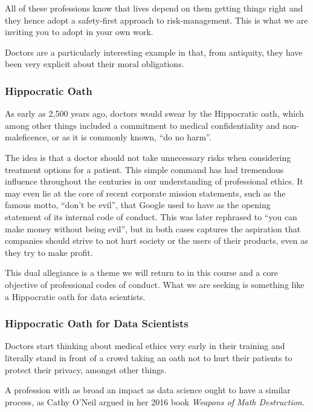 \documentclass[
]{book}
\theoremstyle{definition}
\theoremstyle{definition}
\theoremstyle{definition}
\theoremstyle{definition}
\theoremstyle{remark}
\begin{document}
All of these professions know that lives depend on them getting things right and they hence adopt a safety-first approach to risk-management. This is what we are inviting you to adopt in your own work.

Doctors are a particularly interesting example in that, from antiquity, they have been very explicit about their moral obligations.

\hypertarget{hippocratic-oath}{%
\subsubsection{Hippocratic Oath}\label{hippocratic-oath}}

As early as 2,500 years ago, doctors would swear by the Hippocratic oath, which among other things included a commitment to medical confidentiality and non-maleficence, or as it is commonly known, ``do no harm''.

The idea is that a doctor should not take unnecessary risks when considering treatment options for a patient. This simple command has had tremendous influence throughout the centuries in our understanding of professional ethics. It may even lie at the core of recent corporate mission statements, such as the famous motto, ``don't be evil'', that Google used to have as the opening statement of its internal code of conduct. This was later rephrased to ``you
can make money without being evil'', but in both cases captures the aspiration that companies should strive to not hurt society or the users of their products, even as they try to make profit.

This dual allegiance is a theme we will return to in this course and a core objective of professional codes of conduct. What we are seeking is something like a Hippocratic oath for data scientists.

\hypertarget{hippocratic-oath-for-data-scientists}{%
\subsubsection{Hippocratic Oath for Data Scientists}\label{hippocratic-oath-for-data-scientists}}

Doctors start thinking about medical ethics very early in their training and literally stand in front of a crowd taking an oath not to hurt their patients to protect their privacy, amongst other things.

A profession with as broad an impact as data science ought to have a similar process, as Cathy O'Neil argued in her 2016 book \emph{Weapons of Math Destruction}.
\end{document}
